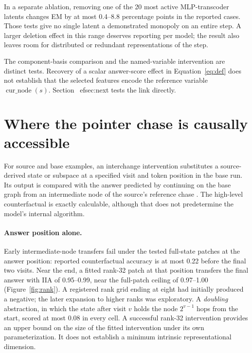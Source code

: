 \documentclass[10pt,letterpaper]{article}
\newcommand{\cur}{\operatorname{cur\_node}}
\begin{document}
In a separate ablation, removing one of the 20 most active MLP-transcoder latents changes EM by at most 0.4--8.8 percentage points in the reported cases. Those tests give no single latent a demonstrated monopoly on an entire step. A larger deletion effect in this range deserves reporting per model; the result also leaves room for distributed or redundant representations of the step.

The component-basis comparison and the named-variable intervention are distinct tests. Recovery of a scalar answer-score effect in Equation~\ref{eq:def} does not establish that the selected features encode the reference variable $\cur(s)$. Section~
ef{sec:next} tests the link directly.

\section{Where the pointer chase is causally accessible}\label{sec:variables}
For source and base examples, an interchange intervention substitutes a source-derived state or subspace at a specified visit and token position in the base run. Its output is compared with the answer predicted by continuing on the base graph from an intermediate node of the source's reference chase \cite{geiger}. The high-level counterfactual is exactly calculable, although that does not predetermine the model's internal algorithm.

\paragraph{Answer position alone.} Early intermediate-node transfers fail under the tested full-state patches at the answer position: reported counterfactual accuracy is at most 0.22 before the final two visits. Near the end, a fitted rank-32 patch at that position transfers the final answer with IIA of 0.95--0.99, near the full-patch ceiling of 0.97--1.00 (Figure~\ref{fig:rank}). A registered rank grid ending at eight had initially produced a negative; the later expansion to higher ranks was exploratory. A \emph{doubling} abstraction, in which the state after visit $v$ holds the node $2^{v-1}$ hops from the start, scored at most 0.08 in every cell. A successful rank-32 intervention provides an upper bound on the size of the fitted intervention under its own parameterization. It does not establish a minimum intrinsic representational dimension.
\end{document}
